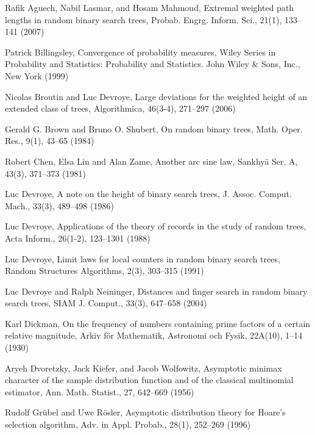 \documentclass{amsart}       %
\begin{document}
\begin{thebibliography}{}
%
%

Rafik Aguech, Nabil Lasmar, and Hosam Mahmoud, Extremal weighted path lengths in random binary search trees, Probab. Engrg. Inform. Sci., 21(1), 133--141 (2007)

Patrick Billingsley, Convergence of probability measures,
 Wiley Series in Probability and Statistics: Probability and
 Statistics.
John Wiley \& Sons, Inc., New York (1999)

Nicolas Broutin and Luc Devroye, Large deviations for the weighted height of an extended class of
  trees, Algorithmica, 46(3-4), 271--297 (2006)

Gerald G. Brown and Bruno O. Shubert,
 On random binary trees, Math. Oper. Res., 9(1), 43--65 (1984)   
  
Robert Chen, Elsa Lin and Alan Zame, Another arc sine law, Sankhy{\=a} Ser. A, 43(3), 371--373 (1981)
 
Luc Devroye, A note on the height of binary search trees, J. Assoc. Comput. Mach., 33(3), 489--498
  (1986)

Luc Devroye, Applications of the theory of records in the study of random trees,
Acta Inform., 26(1-2), 123--1301 (1988)

Luc Devroye, Limit laws for local counters in random binary search trees,
Random Structures Algorithms, 2(3), 303--315 (1991)


Luc Devroye and Ralph Neininger,
 Distances and finger search in random binary search trees, SIAM J. Comput., 33(3), 647--658 (2004)

Karl Dickman,
 On the frequency of numbers containing prime factors of a certain relative 
 magnitude, Arkiv f\"or Mathematik, Astronomi och Fysik, 22A(10), 1--14 (1930) 
 
Aryeh Dvoretzky, Jack Kiefer, and Jacob Wolfowitz, Asymptotic minimax character of the sample distribution function and
  of the classical multinomial estimator,
Ann. Math. Statist., 27, 642--669 (1956)

Rudolf Gr{\"u}bel and Uwe R{\"o}sler, Asymptotic distribution theory for Hoare's selection algorithm,
Adv. in Appl. Probab., 28(1), 252--269 (1996)


\end{thebibliography}
\end{document}

